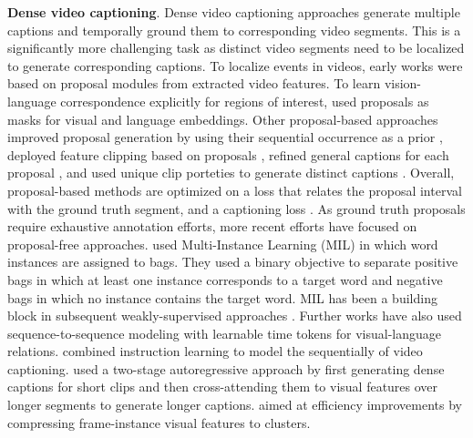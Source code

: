 \noindent
\textbf{Dense video captioning}. Dense video captioning approaches generate multiple captions and temporally ground them to corresponding video segments. This is a significantly more challenging task as distinct video segments need to be localized to generate corresponding captions. To localize events in videos, early works \citep{krishna2017dense,li2018jointly,shi2019dense,wang2018bidirectional,zhou2018end} were based on proposal modules from extracted video features. To learn vision-language correspondence explicitly for regions of interest, \citet{zhou2018end} used proposals as masks for visual and language embeddings. Other proposal-based approaches improved proposal generation by using their sequential occurrence as a prior \citep{mun2019streamlined}, deployed feature clipping based on proposals \citep{iashin2020better,iashin2020multi}, refined general captions for each proposal \citep{deng2021sketch}, and used unique clip porteties to generate distinct captions \citep{perrett2024s}. Overall, proposal-based methods are optimized on a loss that relates the proposal interval with the ground truth segment, and a captioning loss%
. As ground truth proposals require exhaustive annotation efforts, more recent efforts have focused on proposal-free approaches. \citet{shen2017weakly} used Multi-Instance Learning (MIL) in which word instances are assigned to bags. They used a binary objective to separate positive bags in which at least one instance corresponds to a target word and negative bags in which no instance contains the target word. MIL has been a building block in subsequent weakly-supervised approaches \citep{chen2021towards}. Further works \citep{yang2023vid2seq,ren2024timechat} have also used sequence-to-sequence modeling with learnable time tokens for visual-language relations. \citet{mavroudi2023learning} combined instruction learning to model the sequentially of video captioning. \citet{islam2024video} used a two-stage autoregressive approach by first generating dense captions for short clips and then cross-attending them to visual features over longer segments to generate longer captions. \citet{zhou2024streaming} aimed at efficiency improvements by compressing frame-instance visual features to clusters.


